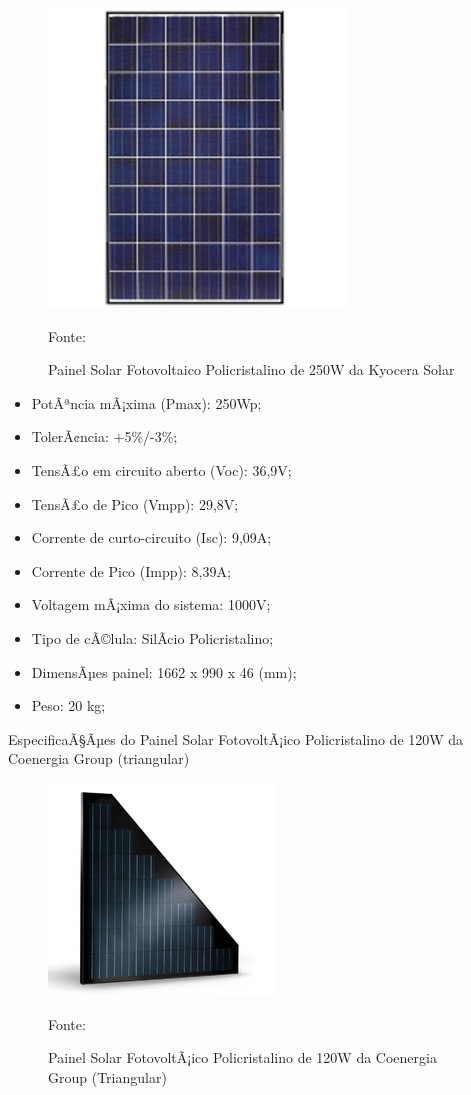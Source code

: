 \begin{figure}[H]
	\centering
	\label{Painel Solar Fotovoltaico Policristalino de 250W da Kyocera Solar}
		\includegraphics[keepaspectratio=true,scale=0.9]{solar/1.png}
	\caption{Painel Solar Fotovoltaico Policristalino de 250W da Kyocera Solar}
	\small{Fonte: \cite{KYOCERA}}
\end{figure}

\begin{itemize}
	\item PotÃªncia mÃ¡xima (Pmax): 250Wp;
	\item TolerÃ¢ncia: +5\%/-3\%;
	\item TensÃ£o em circuito aberto (Voc): 36,9V;
	\item TensÃ£o de Pico (Vmpp): 29,8V;
	\item Corrente de curto-circuito (Isc): 9,09A;
	\item Corrente de Pico (Impp): 8,39A;
	\item Voltagem mÃ¡xima do sistema: 1000V; 
	\item Tipo de cÃ©lula: SilÃ­cio Policristalino;
	\item DimensÃµes painel: 1662 x 990 x 46 (mm);
	\item Peso: 20 kg; 
\end{itemize}

EspecificaÃ§Ãµes do Painel Solar FotovoltÃ¡ico Policristalino de 120W da Coenergia Group (triangular)

\begin{figure}[H]
	\centering
	\label{Painel Solar FotovoltÃ¡ico Policristalino de 120W da Coenergia Group (Triangular)}
		\includegraphics[keepaspectratio=true,scale=0.9]{solar/2.png}
	\caption{Painel Solar FotovoltÃ¡ico Policristalino de 120W da Coenergia Group (Triangular)}
	\small{Fonte: \cite{KYOCERA}}
\end{figure}

